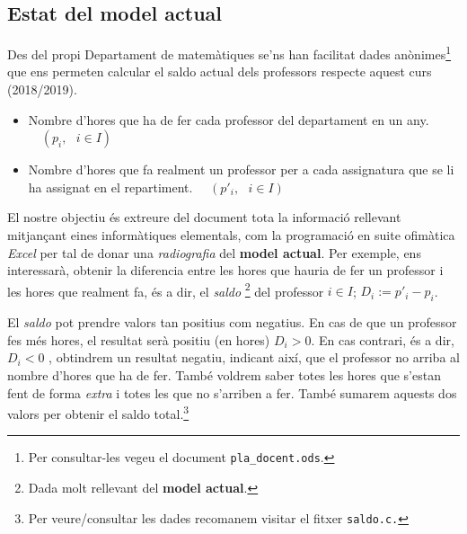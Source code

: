 \documentclass[10pt,twocolumn]{article}
\newcommand{\esp}{\text{ }}
\newcommand{\cod}[1]{{ \color{redviolet}\texttt{#1}}}
\begin{document}
\subsection{Estat del model actual}
Des del propi Departament de matemàtiques se'ns han facilitat dades anònimes\footnote{Per consultar-les vegeu el document \cod{pla\_docent.ods}.} que ens permeten calcular el saldo actual dels professors respecte aquest curs (2018/2019). 
\begin{itemize}
	\item Nombre d'hores que ha de fer cada professor del departament en un any.$\quad(p_i, \esp i \in I)$
	\item Nombre d'hores que fa realment un professor per a cada assignatura que se li ha assignat en el repartiment. $\quad (p'_i, \esp i \in I)$
\end{itemize}
El nostre objectiu és extreure del document tota la informació rellevant  mitjançant eines informàtiques elementals, com la programació en suite ofimàtica \textit{Excel}  per tal de donar una \textit{radiografia} del \textbf{model actual}. Per exemple, ens interessarà, obtenir la diferencia entre les hores que hauria de fer un professor i les hores que realment fa, és a dir, el \textit{saldo} \footnote{Dada molt rellevant del \textbf{model actual}.} del professor $i\in I$; $D_i:=p'_i-p_i$.

El \textit{saldo} pot prendre valors tan positius com negatius. En cas de que un professor fes més hores, el resultat  serà positiu (en hores) $D_i>0$. En cas contrari, és a dir, $D_i<0$ , obtindrem un resultat negatiu, indicant així, que el professor no arriba al nombre d'hores que ha de fer. També voldrem saber totes les hores que s'estan fent de forma \textit{extra} i totes les que no s'arriben a fer.  També sumarem aquests dos valors per obtenir el saldo total.\footnote{Per veure/consultar les dades recomanem visitar el fitxer \cod{saldo.c.}}
\end{document}
